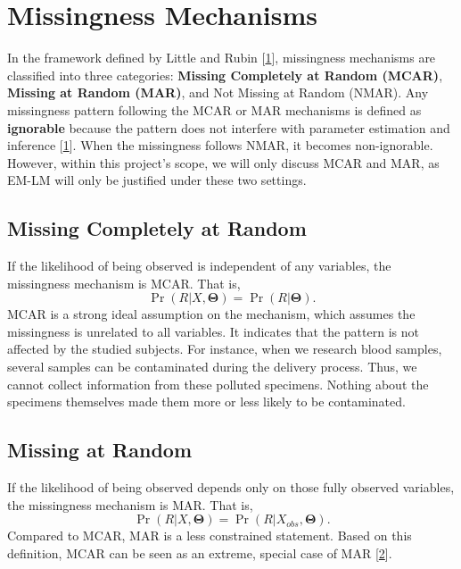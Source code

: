 \documentclass[
  twocolumn]{article}
\begin{document}
\hypertarget{missingness-mechanisms}{%
\section{Missingness Mechanisms}\label{missingness-mechanisms}}

In the framework defined by Little and Rubin
{[}\protect\hyperlink{ref-little2019statistical}{1}{]}, missingness
mechanisms are classified into three categories: \textbf{Missing
Completely at Random (MCAR)}, \textbf{Missing at Random (MAR)}, and Not
Missing at Random (NMAR). Any missingness pattern following the MCAR or
MAR mechanisms is defined as \textbf{ignorable} because the pattern does
not interfere with parameter estimation and inference
{[}\protect\hyperlink{ref-little2019statistical}{1}{]}. When the
missingness follows NMAR, it becomes non-ignorable. However, within this
project's scope, we will only discuss MCAR and MAR, as EM-LM will only
be justified under these two settings.

\hypertarget{missing-completely-at-random}{%
\subsection{Missing Completely at
Random}\label{missing-completely-at-random}}

If the likelihood of being observed is independent of any variables, the
missingness mechanism is MCAR. That is, \[
\Pr(R|X,  \boldsymbol\Theta) = \Pr(R| \boldsymbol\Theta).
\] MCAR is a strong ideal assumption on the mechanism, which assumes the
missingness is unrelated to all variables. It indicates that the pattern
is not affected by the studied subjects. For instance, when we research
blood samples, several samples can be contaminated during the delivery
process. Thus, we cannot collect information from these polluted
specimens. Nothing about the specimens themselves made them more or less
likely to be contaminated.

\hypertarget{missing-at-random}{%
\subsection{Missing at Random}\label{missing-at-random}}

If the likelihood of being observed depends only on those fully observed
variables, the missingness mechanism is MAR. That is, \[
\Pr(R|X, \boldsymbol\Theta) = \Pr(R|X_{obs}, \boldsymbol\Theta).
\] Compared to MCAR, MAR is a less constrained statement. Based on this
definition, MCAR can be seen as an extreme, special case of MAR
{[}\protect\hyperlink{ref-schafer2002missing}{2}{]}.
\end{document}

